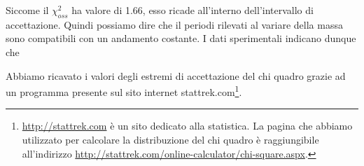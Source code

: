 Siccome il $\chi_{oss}^2$ ha valore di 1.66, esso ricade all'interno dell'intervallo di accettazione.
Quindi possiamo dire che il periodi rilevati
al variare della massa sono compatibili con un andamento costante. I dati sperimentali indicano dunque che

Abbiamo ricavato i valori degli estremi di accettazione del chi quadro grazie ad un programma presente sul sito internet stattrek.com\footnote{
\url{http://stattrek.com} è un sito dedicato alla statistica. La pagina che abbiamo utilizzato per calcolare la distribuzione del chi quadro
è raggiungibile all'indirizzo \url{http://stattrek.com/online-calculator/chi-square.aspx}.}.
